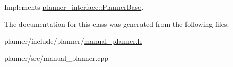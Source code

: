 Implements \hyperlink{classplanner__interface_1_1PlannerBase_a7f8186e617225bb48183d619930d950a}{planner\+\_\+interface\+::\+Planner\+Base}.



The documentation for this class was generated from the following files\+:\begin{DoxyCompactItemize}
\item 
planner/include/planner/\hyperlink{manual__planner_8h}{manual\+\_\+planner.\+h}\item 
planner/src/manual\+\_\+planner.\+cpp\end{DoxyCompactItemize}
